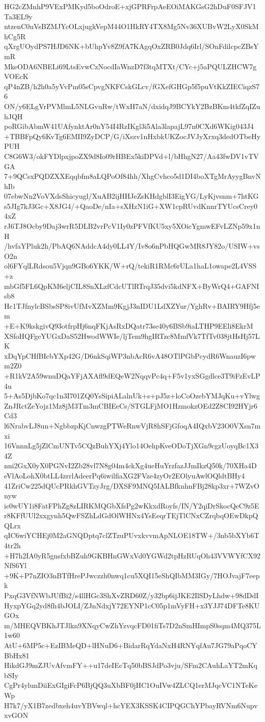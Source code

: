 HG2cZMnhP9VExPMKyd5boOdroE+xjGPRFrpAeEOiMAKGsG2hDuF0SFJV1Ta3EL9y
ntzenC0uVsBZMJYcOLxjugkVepM44O1HkRY4TX8Mg5Nv36XUBvW2LyX0SkMhCg5R
qXrgUOydPS7HJD6NK+bUhpYv8Z9fA7KAgqOxZRB0Jdq6Irl/SOnFdilcpcZBsYmR
MkeODA6NBELi69LtsEvwCzNocdIaWnzD7f3tqMTXt/CYc+j5aPQULZHCW7gVOEcK
qP4nZB/h2h0a5yVvPm05sCpvgNKFCskGLcv/fGXefGHGp5f5puVtKkZIECiqzS76
ON/y6ELgVrPVMlmL5NLGvuRw/tWxH7aN/dxidqJ9BCYkY2BzBKm4tkfZqIZuhJQH
poRGibAbmW41UAfynktAr0nY54I4RzIKgl3i5Ala3lapajL97n0CXd6WKig043J4
+TBBFpQy6KvTg6EMII9ZyDCP/G/iXszv1nHxbkUKZocJVJyXrxq3dedOTbeHyPUH
C8G6W3/okFYDlpxjpoZX9d8Io09rHBEx5kiDPVd+l/bHhgN27/Aa43fwDV1vTVGA
7+9QCsxPQDZXXEqqbfm8aLQPoOf84hh/XhgCvhco5d1DI4boXTgMrAyygBnvNhIb
07ebwNn2VoVXdsShicyugl/XuAB2ijHHJeZsKHdgblI3EigYG/LyKjvsnm+7htKG
s5JIg7kJ3Gc+X8JG4/+QaoDe/nIa+sXHzN1iG+XW1cpRUvdKnnrTYUcsCrey04xZ
rJ6TJ8Ocby9Daj3wrR5DLB2vrPcV1Iy0zPFVfKU5xy5XOicYgmwEFvLZNp59x1nH
/hvfaYPluk2h/PbAQ6NAddcA4dy0LL4Y/Iv8o6nPbHQGwMR8JY82o/USIW+vsO2n
ol6FYqlLRdsou5Vjqn9GBo6YKK/W+rQ/tekiR1RMc6rULa1haL1owape2L4VSS+z
mbGf5FL6QpKM6eljCIL8SnXLzfCdcUTlRTrqJ35dvi5kdNFX+ByWrQ4+GAFNIsb8
Hc1TJfnylcBSbsSP8ivUfMvXZMm9KgjJ3nIDU1LdXZYur/YghRv+BAIRY9Hfj5em
+E+K9kskgivQ93otfrpHj6nqFKjAsRxDQatr73se40y6BSb9iaLTHP9EEli8EkrM
XSfoHQFgeYUGxDaS52HwodWWIe/ljTem9hgIRTzc8MmfVk7TfTv038jtHsHj57LK
xDqYpCHfBIcbYXp42G/D6nkSqiWP3nbAcR6vA48OTlPGbPcydR6WnauzI6pwm2Z0
+R1kV2A59wnuDQaYFjAXAfl9dEQeW2NqqvPc4q+F5v1yxSGgdlce3T9iFzEvLP4u
5+As5DjbKo7qc1n3I701ZQ0YsSipiALalnUk+s+pJ5z+loCoOzebYMJqKu+vYlwg
ZnJRctZeYojz1Mz8jM3Tm3mCBIEeCs/STGLFjMO1HzmokzOEd2Z8CI92HYjr6Cd3
l6NrabvLJ8un+NgbbzpKjCnwzgPTWeRnwVjR8hSFjGfoqA4IQxbV23O0VXsn7mxi
16VnnnLg5jZlCmUNTv5CQzBuhYXj4Ylo14OehpKveODoTjXGn9cgzUoyqBc1X34Z
nni2GxX0yX0PGNvI2Zb28vl7N8g04m4ckXg4ueHuYrzfazJJmIkzQ50k/70XHa4D
eVlAoLohX0btLL4zrrlAdeerPq6iwilfiaXG2FVze4zyOr2EOlyuAwlOQldtBHy4
41ZriCw225dQUcPRkhGVTzyJrg/DXSF9MNQ5IALBfknhnFBj28kp3xr+7WZvOnyw
ic0wUY1i8FatFPhZg8zLIRKMQGbXfsPg2wKkxdRoyfs/IN/Y2qiDrSkocQeC9z5E
r8KFfUUl2xxgynh5QwFSZhLdGdOlWHNx4YsEeqrTEjTlCNxCZrqbqOEwDkpQQLrx
qIC6wiYCHEj0M2aGNQDptq7clZTzuPUvxkvvmApNLOE18TW+/3nb5bXYb6T4tr2h
+H7h2IA0yR5gnsfxbBZuh9GKBHnGWxVd0YGWd2tpHzRUqOh43VVWYfCX92NfS6Yl
+9K+P7nZIO3nBTfHrePJwczzh0nwq1cu5XQI15eShQIbMM3IGy/7HOJvajF7eepk
PxqG3VfNWbJUfBi2/s4llHGc3ShXvZRD60Z/y32bp6ijJKE2IlSDyLhdw+98dDdI
HyxpYGq2yd8fh4bJOLI/ZJnNdxjY72EYNP1cC05p1mVyFH+x3YJJ74DFTe8KUGOx
m/MHEQVBKhJTJlkn9XNqyCwZhYzvqcFD01fiTs7D2nSmHImpS0sqm4MQ375L1w60
AtU+6MP5c+EzIBMeQD+lHNuD6+BidarRqYdaNxH4RNYqfAu7JG79aPqoCYBbHx81
HikdGJ9mZJUvAfvmFY++u17deIEcTq50bBSJdPo3vju/SFm2CAuhLaYT2mKqbSIy
CgPr4ylunDiiExGIgiFcP6BjQQ3uXbBF0jHC1OuIVw4ZLCQ1erMJqcVC1NTeKeWp
H7k7/yX1B7zedbxeh4uvYBVwql+hcYEX3KSSK4CIPQGChYPbayRVNm6NupvxvGON
